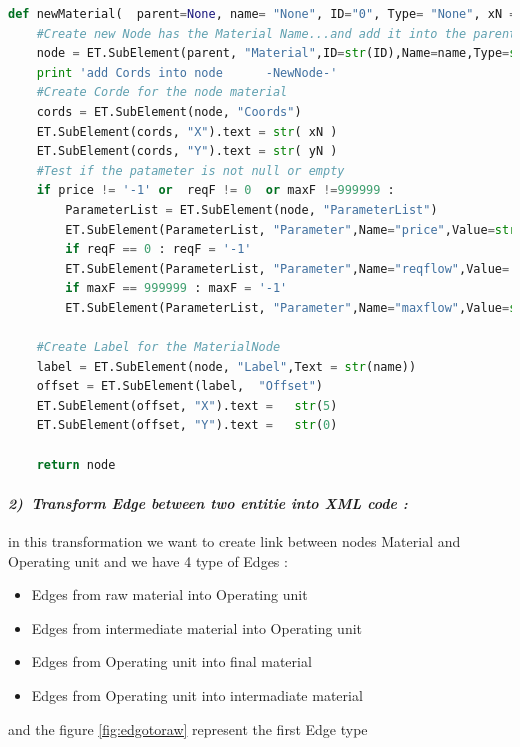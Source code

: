 \vspace{1cm}
\begin{lstlisting}[language=Python, caption=Python Function Material]
def newMaterial(  parent=None, name= "None", ID="0", Type= "None", xN ='-1', yN ='-1' ,price='-1' ,reqF = 0  ,maxF =999999 ):
	#Create new Node has the Material Name...and add it into the parent node
	node = ET.SubElement(parent, "Material",ID=str(ID),Name=name,Type=str(Type))
    print 'add Cords into node		-NewNode-'
	#Create Corde for the node material
	cords = ET.SubElement(node, "Coords")
	ET.SubElement(cords, "X").text = str( xN )
	ET.SubElement(cords, "Y").text = str( yN )
	#Test if the patameter is not null or empty
	if price != '-1' or  reqF != 0  or maxF !=999999 : 
		ParameterList = ET.SubElement(node, "ParameterList")
		ET.SubElement(ParameterList, "Parameter",Name="price",Value=str( price) )
		if reqF == 0 : reqF = '-1'
		ET.SubElement(ParameterList, "Parameter",Name="reqflow",Value= str(reqF) )
		if maxF == 999999 : maxF = '-1'
		ET.SubElement(ParameterList, "Parameter",Name="maxflow",Value=str(maxF) )

	#Create Label for the MaterialNode
	label = ET.SubElement(node, "Label",Text = str(name))
	offset = ET.SubElement(label,  "Offset")
	ET.SubElement(offset, "X").text =   str(5)
	ET.SubElement(offset, "Y").text =   str(0)
	
	return node
\end{lstlisting}

\paragraph{\emph{2)~Transform Edge between two entitie into XML code :} } in this transformation 
we want to create link between nodes Material and Operating unit 
and we have  4 type of Edges : 
\begin{itemize}
	\item Edges from raw material into Operating unit
	\item Edges from intermediate material into Operating unit
	
	\item Edges from  Operating unit into final material
	\item Edges from  Operating unit into intermadiate material 
\end{itemize}
and the figure \ref{fig:edgotoraw} represent the first Edge type 

